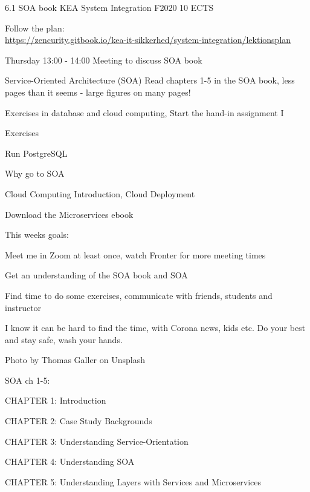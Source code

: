 \documentclass[Screen16to9,17pt]{foils}
\begin{document}
\mytitlepage
{6.1 SOA book }
{KEA System Integration F2020 10 ECTS}



\begin{list2}
\item Follow the plan:\\
\url{https://zencurity.gitbook.io/kea-it-sikkerhed/system-integration/lektionsplan}
\item Thursday 13:00 - 14:00 Meeting to discuss SOA book
\item Service-Oriented Architecture (SOA) Read chapters 1-5 in the SOA book, less pages than it seems - large figures on many pages!
\item Exercises in database and cloud computing, Start the hand-in assignment I
\end{list2}

Exercises
\begin{list2}
\item Run PostgreSQL
\item Why go to SOA
\item Cloud Computing Introduction, Cloud Deployment
\item Download the Microservices ebook
\end{list2}




This weeks goals:
\begin{list2}
\item Meet me in Zoom at least once, watch Fronter for more meeting times
\item Get an understanding of the SOA book and SOA
\item Find time to do some exercises, communicate with friends, students and instructor
\end{list2}

I know it can be hard to find the time, with Corona news, kids etc. Do your best and stay safe, wash your hands.

Photo by Thomas Galler on Unsplash







SOA ch 1-5:
\begin{list2}
\item CHAPTER 1: Introduction
\item CHAPTER 2: Case Study Backgrounds
\item CHAPTER 3: Understanding Service-Orientation
\item CHAPTER 4: Understanding SOA
\item CHAPTER 5: Understanding Layers with Services and Microservices
\end{list2}
\end{document}
